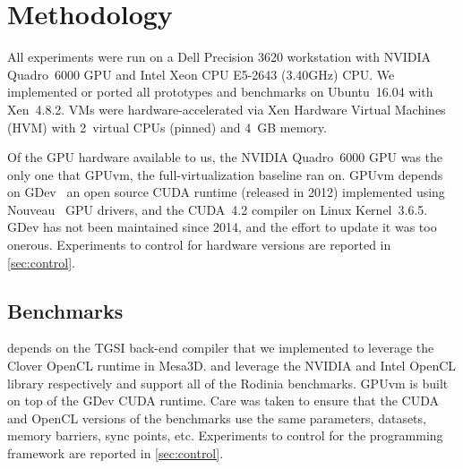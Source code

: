 \section{Methodology}
\label{sec_method}

All experiments were run on a Dell Precision 3620 workstation with NVIDIA
Quadro~6000 GPU and Intel Xeon CPU E5-2643 (3.40GHz) CPU. We implemented or ported all prototypes
and benchmarks on Ubuntu~16.04 with Xen~4.8.2. VMs were hardware-accelerated via Xen Hardware
Virtual Machines (HVM) with 2~virtual CPUs (pinned) and 4~GB memory.

Of the GPU hardware available to us, the NVIDIA Quadro~6000 GPU was the only one that GPUvm, the
full-virtual\-ization baseline ran on. GPUvm depends on GDev~\cite{gdev}
an open source CUDA runtime (released in 2012) implemented using Nouveau~\cite{nouveau} GPU
drivers, and the CUDA~4.2 compiler on Linux Kernel~3.6.5. GDev has not been maintained since 2014,
and the effort to update it was too onerous.
Experiments to control for hardware versions are reported in \ref{sec:control}.

\subsection{Benchmarks}
\XenSVGA depends on the TGSI back-end compiler that we implemented to leverage
the Clover OpenCL runtime in Mesa3D.
\apigpu and \apicpu leverage the NVIDIA and Intel OpenCL library respectively
and support all of the Rodinia benchmarks.
GPUvm is built on top of the GDev CUDA runtime.
Care was taken to ensure that the CUDA and OpenCL versions of the benchmarks use the same
parameters, datasets, memory barriers, sync points, etc. Experiments to
control for the programming framework are reported in \ref{sec:control}.


